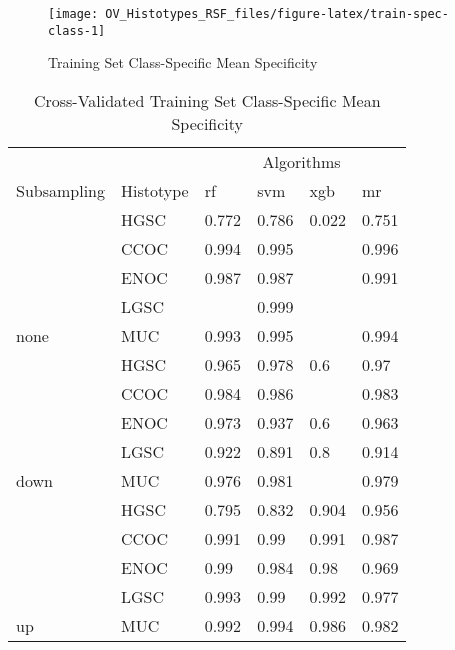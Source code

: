 \documentclass[
]{report}
\begin{document}
\begin{figure}[H]

{\centering \texttt{[image: OV\_Histotypes\_RSF\_files/figure-latex/train-spec-class-1]} 

}

\caption{Training Set Class-Specific Mean Specificity}\label{fig:train-spec-class}
\end{figure}

\begin{table}

\caption{\label{tab:train-spec-class-table}Cross-Validated Training Set Class-Specific Mean Specificity}
\centering
\begin{tabular}[t]{l|l|l|l|l|l}
\hline
\multicolumn{2}{c|}{ } & \multicolumn{4}{c}{Algorithms} \\
\cline{3-6}
Subsampling & Histotype & rf & svm & xgb & mr\\
\hline
 & HGSC & 0.772 & 0.786 & 0.022 & 0.751\\
\cline{2-6}
 & CCOC & 0.994 & 0.995 & \cellcolor[HTML]{90ee90}{1} & 0.996\\
\cline{2-6}
 & ENOC & 0.987 & 0.987 & \cellcolor[HTML]{90ee90}{1} & 0.991\\
\cline{2-6}
 & LGSC & \cellcolor[HTML]{90ee90}{1} & 0.999 & \cellcolor[HTML]{90ee90}{1} & \cellcolor[HTML]{90ee90}{1}\\
\cline{2-6}
\multirow{-5}{*}{\raggedright\arraybackslash none} & MUC & 0.993 & 0.995 & \cellcolor[HTML]{90ee90}{1} & 0.994\\
\cline{1-6}
 & HGSC & 0.965 & 0.978 & 0.6 & 0.97\\
\cline{2-6}
 & CCOC & 0.984 & 0.986 & \cellcolor[HTML]{90ee90}{1} & 0.983\\
\cline{2-6}
 & ENOC & 0.973 & 0.937 & 0.6 & 0.963\\
\cline{2-6}
 & LGSC & 0.922 & 0.891 & 0.8 & 0.914\\
\cline{2-6}
\multirow{-5}{*}{\raggedright\arraybackslash down} & MUC & 0.976 & 0.981 & \cellcolor[HTML]{90ee90}{1} & 0.979\\
\cline{1-6}
 & HGSC & 0.795 & 0.832 & 0.904 & 0.956\\
\cline{2-6}
 & CCOC & 0.991 & 0.99 & 0.991 & 0.987\\
\cline{2-6}
 & ENOC & 0.99 & 0.984 & 0.98 & 0.969\\
\cline{2-6}
 & LGSC & 0.993 & 0.99 & 0.992 & 0.977\\
\cline{2-6}
\multirow{-5}{*}{\raggedright\arraybackslash up} & MUC & 0.992 & 0.994 & 0.986 & 0.982\\

\end{tabular}
\end{table}
\end{document}
